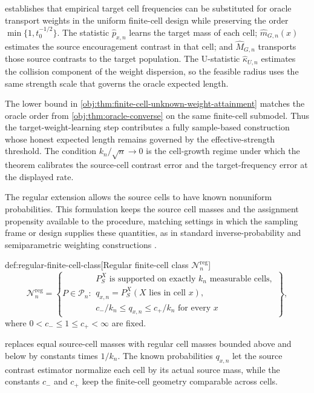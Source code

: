  establishes that empirical target cell frequencies can be substituted for oracle transport weights in the uniform finite-cell design while preserving the order \(\min\{1,t_0^{-1/2}\}\). The statistic \(\widehat p_{x,n}\) learns the target mass of each cell; \(\widehat m_{G,n}(x)\) estimates the source encouragement contrast in that cell; and \(\widehat M_{G,n}\) transports those source contrasts to the target population. The U-statistic \(\widehat\kappa_{U,n}\) estimates the collision component of the weight dispersion, so the feasible radius uses the same strength scale that governs the oracle expected length.

The lower bound in \cref{obj:thm:finite-cell-unknown-weight-attainment} matches the oracle order from \cref{obj:thm:oracle-converse} on the same finite-cell submodel. Thus the target-weight-learning step contributes a fully sample-based construction whose honest expected length remains governed by the effective-strength threshold. The condition \(k_n/\sqrt n\to0\) is the cell-growth regime under which the theorem calibrates the source-cell contrast error and the target-frequency error at the displayed rate.

The regular extension allows the source cells to have known nonuniform probabilities. This formulation keeps the source cell masses and the assignment propensity available to the procedure, matching settings in which the sampling frame or design supplies these quantities, as in standard inverse-probability and semiparametric weighting constructions \citep{HiranoImbensRidder2003,RobinsRotnitzkyZhao1994,VanDerLaanRubin2006,Chernozhukov2018}.

\begin{definitionv}{def:regular-finite-cell-class}[Regular finite-cell class \(\mathcal N_n^{\mathrm{reg}}\)]
\[
\mathcal N_n^{\mathrm{reg}}
=
\left\{
P\in\mathcal P_n:
\begin{array}{l}
P_S^X \text{ is supported on exactly } k_n \text{ measurable cells},\\
q_{x,n}=P_S^X(X \text{ lies in cell } x),\\
c_-/k_n\le q_{x,n}\le c_+/k_n \text{ for every } x
\end{array}
\right\},
\]
where \(0<c_-\le 1\le c_+<\infty\) are fixed.
\end{definitionv}

 replaces equal source-cell masses with regular cell masses bounded above and below by constants times \(1/k_n\). The known probabilities \(q_{x,n}\) let the source contrast estimator normalize each cell by its actual source mass, while the constants \(c_-\) and \(c_+\) keep the finite-cell geometry comparable across cells.

